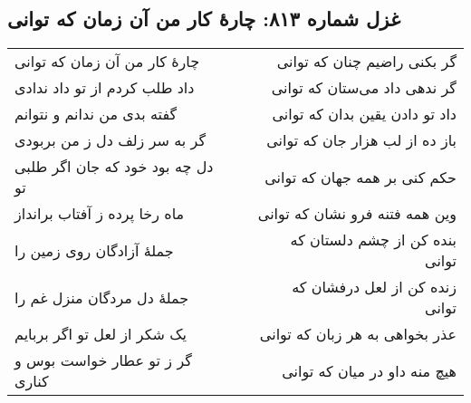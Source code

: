 \begin{center}
\section*{غزل شماره ۸۱۳: چارهٔ کار من آن زمان که توانی}
\label{sec:813}
\begin{longtable}{l p{0.5cm} r}
چارهٔ کار من آن زمان که توانی
&&
گر بکنی راضیم چنان که توانی
\\
داد طلب کردم از تو داد ندادی
&&
گر ندهی داد می‌ستان که توانی
\\
گفته بدی من ندانم و نتوانم
&&
داد تو دادن یقین بدان که توانی
\\
گر به سر زلف دل ز من بربودی
&&
باز ده از لب هزار جان که توانی
\\
دل چه بود خود که جان اگر طلبی تو
&&
حکم کنی بر همه جهان که توانی
\\
ماه رخا پرده ز آفتاب برانداز
&&
وین همه فتنه فرو نشان که توانی
\\
جملهٔ آزادگان روی زمین را
&&
بنده کن از چشم دلستان که توانی
\\
جملهٔ دل مردگان منزل غم را
&&
زنده کن از لعل درفشان که توانی
\\
یک شکر از لعل تو اگر بربایم
&&
عذر بخواهی به هر زبان که توانی
\\
گر ز تو عطار خواست بوس و کناری
&&
هیچ منه داو در میان که توانی
\\
\end{longtable}
\end{center}
